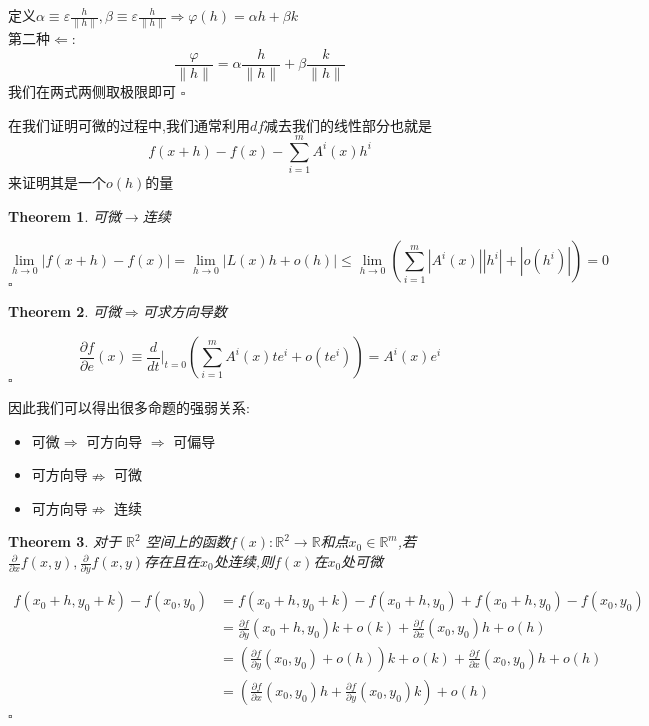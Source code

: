 \documentclass[11pt,hyperref,a4paper,UTF8]{ctexart}
\newtheorem{theorem}{Theorem}[subsection]
\newenvironment{cproof}{%
\heiti{证明}\kaishu
}{%
  \hfill $\square$
  \par\bigskip
}
\newcommand{\RR}{\mathbb{R}}
\newcommand{\parameter}[1]{\left(#1\right)}
\newcommand{\abs}[1]{\left|#1\right|}
\begin{document}
\begin{CJK}{UTF8}{gkai}
\begin{cproof}
  定义$\alpha \equiv \varepsilon\frac{h}{\|h\|}, \beta \equiv \varepsilon \frac{h}{\|h\|} \Rightarrow \varphi(h) = \alpha h + \beta k$\\

  第二种$\Leftarrow$:
  \[\frac{\varphi}{\|h\|} = \alpha\frac{h}{\|h\|} + \beta\frac{k}{\|h\|}\]
  我们在两式两侧取极限即可
\end{cproof}

在我们证明可微的过程中,我们通常利用$df$减去我们的线性部分也就是
\[f(x + h) - f(x) - \sum_{i = 1}^{m}A^i(x) h^i\]
来证明其是一个$o(h)$的量

\begin{theorem}
  可微$\rightarrow$连续
\end{theorem}

\begin{cproof}
  \[\lim_{h\to 0}\abs{f(x + h) - f(x)} = \lim_{h\to 0}\abs{L(x)h + o(h)} \leq \lim_{h \to 0} \parameter{\sum_{i = 1}^{m} |A^i(x)| |h^i| + |o(h^i)|} = 0\]
\end{cproof}

\begin{theorem}
  可微$\Rightarrow$可求方向导数
\end{theorem}

\begin{cproof}
  \[\frac{\partial f}{\partial e}(x) \equiv \frac{d}{dt}|_{t =  0} \parameter{\sum_{i = 1}^{m} A^i(x) t e^i + o(te^i)} = A^i(x)e^i\]
\end{cproof}

因此我们可以得出很多命题的强弱关系:

\begin{itemize}
  \item 可微$\Rightarrow$ 可方向导 $\Rightarrow$ 可偏导
  \item 可方向导$\nRightarrow$ 可微
  \item 可方向导$\nRightarrow$ 连续
\end{itemize}

\begin{theorem}
  对于 $\RR^2$ 空间上的函数$f(x) : \RR^2 \to \RR$和点$x_0 \in \RR^m$,若$\frac{\partial}{\partial x}f(x,y),\frac{\partial}{\partial y}f(x,y)$存在且在$x_0$处连续,则$f(x)$在$x_0$处可微
\end{theorem}

\begin{cproof}
  \[\begin{aligned}
    f(x_0 + h,y_0 + k) - f(x_0,y_0) &= f(x_0 + h,y_0 + k) - f(x_0 + h,y_0) + f(x_0 + h,y_0) - f(x_0,y_0)\\
    &= \frac{\partial f}{\partial y}(x_0+h,y_0)k + o(k) +\frac{\partial f}{\partial x}(x_0,y_0)h + o(h)\\
    &= \parameter{\frac{\partial f}{\partial y}(x_0,y_0) + o(h
    )}k + o(k) +\frac{\partial f}{\partial x}(x_0,y_0)h + o(h)\\    
    &=\parameter{\frac{\partial f}{\partial x}(x_0,y_0)h + \frac{\partial f}{\partial y}(x_0,y_0)k } + o(h)\\ 
  \end{aligned}\]
\end{cproof}


\end{CJK}
\end{document}
